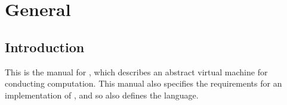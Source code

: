 \chapter{General}

\section{Introduction}

This is the manual for \lepix{}, which describes an abstract virtual machine for conducting computation. This manual also specifies the requirements for an implementation of \lepix{}, and so also defines the \lepix{} language.
